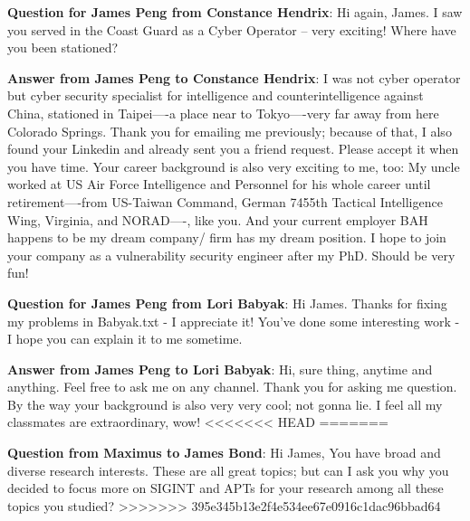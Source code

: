 \textbf{Question for James Peng from Constance Hendrix}:  Hi again, James.  I saw you served in the Coast Guard as a Cyber Operator -- very exciting!  Where have you been stationed?

\textbf{Answer from James Peng to Constance Hendrix}:  I was not cyber operator but cyber security specialist for intelligence and counterintelligence against China, stationed in Taipei----a place near to Tokyo----very far away from here Colorado Springs. Thank you for emailing me previously; because of that, I also found your Linkedin and already sent you a friend request. Please accept it when you have time. Your career background is also very exciting to me, too: My uncle worked at US Air Force Intelligence and Personnel for his whole career until retirement----from US-Taiwan Command, German 7455th Tactical Intelligence Wing, Virginia, and NORAD----, like you. And your current employer BAH happens to be my dream company/ firm has my dream position. I hope to join your company as a vulnerability security engineer after my PhD. Should be very fun!   

\textbf{Question for James Peng from Lori Babyak}:  Hi James. Thanks for fixing my problems in Babyak.txt - I appreciate it!  You've done some interesting work - I hope you can explain it to me sometime.

\textbf{Answer from James Peng to Lori Babyak}:  Hi, sure thing, anytime and anything. Feel free to ask me on any channel. Thank you for asking me question. By the way your background is also very very cool; not gonna lie. I feel all my classmates are extraordinary, wow!
<<<<<<< HEAD
=======

\textbf{Question from Maximus to James Bond}: Hi James, You have broad and diverse research interests. These are all great topics; but can I ask you why you decided to focus more on SIGINT and APTs for your research among all these topics you studied? 
>>>>>>> 395e345b13e2f4e534ee67e0916c1dac96bbad64
